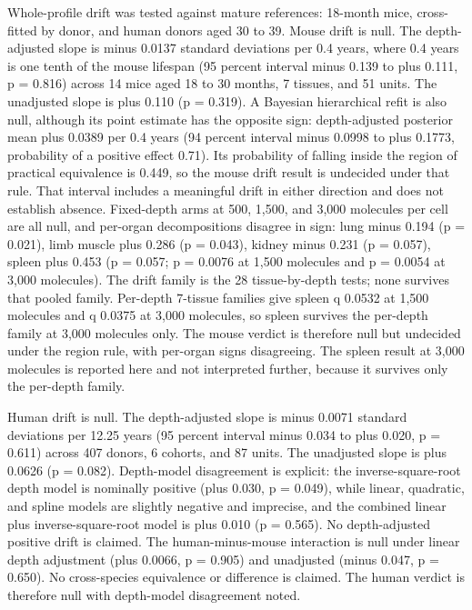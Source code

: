 \documentclass[11pt]{article}
\begin{document}
Whole-profile drift was tested against mature references: 18-month mice, cross-fitted by donor, and human donors aged 30 to 39. Mouse drift is null. The depth-adjusted slope is minus 0.0137 standard deviations per 0.4 years, where 0.4 years is one tenth of the mouse lifespan (95 percent interval minus 0.139 to plus 0.111, p = 0.816) across 14 mice aged 18 to 30 months, 7 tissues, and 51 units. The unadjusted slope is plus 0.110 (p = 0.319). A Bayesian hierarchical refit is also null, although its point estimate has the opposite sign: depth-adjusted posterior mean plus 0.0389 per 0.4 years (94 percent interval minus 0.0998 to plus 0.1773, probability of a positive effect 0.71). Its probability of falling inside the region of practical equivalence is 0.449, so the mouse drift result is undecided under that rule. That interval includes a meaningful drift in either direction and does not establish absence. Fixed-depth arms at 500, 1,500, and 3,000 molecules per cell are all null, and per-organ decompositions disagree in sign: lung minus 0.194 (p = 0.021), limb muscle plus 0.286 (p = 0.043), kidney minus 0.231 (p = 0.057), spleen plus 0.453 (p = 0.057; p = 0.0076 at 1,500 molecules and p = 0.0054 at 3,000 molecules). The drift family is the 28 tissue-by-depth tests; none survives that pooled family. Per-depth 7-tissue families give spleen q 0.0532 at 1,500 molecules and q 0.0375 at 3,000 molecules, so spleen survives the per-depth family at 3,000 molecules only. The mouse verdict is therefore null but undecided under the region rule, with per-organ signs disagreeing. The spleen result at 3,000 molecules is reported here and not interpreted further, because it survives only the per-depth family.

Human drift is null. The depth-adjusted slope is minus 0.0071 standard deviations per 12.25 years (95 percent interval minus 0.034 to plus 0.020, p = 0.611) across 407 donors, 6 cohorts, and 87 units. The unadjusted slope is plus 0.0626 (p = 0.082). Depth-model disagreement is explicit: the inverse-square-root depth model is nominally positive (plus 0.030, p = 0.049), while linear, quadratic, and spline models are slightly negative and imprecise, and the combined linear plus inverse-square-root model is plus 0.010 (p = 0.565). No depth-adjusted positive drift is claimed. The human-minus-mouse interaction is null under linear depth adjustment (plus 0.0066, p = 0.905) and unadjusted (minus 0.047, p = 0.650). No cross-species equivalence or difference is claimed. The human verdict is therefore null with depth-model disagreement noted.
\end{document}
